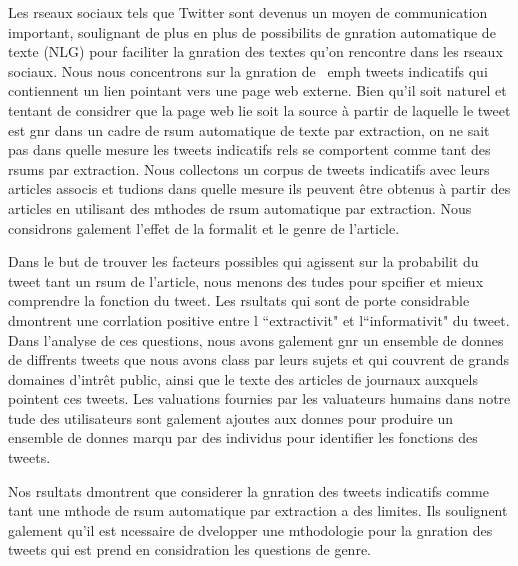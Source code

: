 Les rseaux  sociaux tels que Twitter sont devenus un moyen de communication important, soulignant de plus en plus de possibilits de gnration automatique de texte (NLG) pour faciliter la gnration des textes qu’on rencontre dans les rseaux  sociaux. Nous nous concentrons sur la gnration de \ emph {tweets indicatifs} qui contiennent un lien pointant vers une page web externe. Bien qu’il soit naturel et tentant de considrer que la page web lie soit la source à partir de laquelle le tweet est gnr dans un cadre de rsum automatique de texte par extraction, on ne sait pas dans quelle mesure les tweets indicatifs rels se comportent comme tant des rsums par extraction. Nous collectons un corpus de tweets indicatifs avec leurs articles associs et tudions dans quelle mesure ils peuvent être obtenus à partir des articles en utilisant des mthodes de rsum automatique par extraction. Nous considrons galement l'effet de la formalit et le genre de l'article.

Dans le but de trouver les facteurs possibles qui agissent sur la probabilit du tweet tant un rsum de l'article, nous menons des tudes pour spcifier et mieux comprendre la fonction du tweet. Les rsultats qui sont de porte considrable dmontrent une corrlation positive entre l ``extractivit" et l``informativit" du tweet. Dans l'analyse de ces questions, nous avons galement gnr un ensemble de donnes de diffrents tweets que nous avons class par leurs sujets et qui couvrent de grands domaines d'intrêt public, ainsi que le texte des articles de journaux auxquels pointent ces tweets. Les valuations fournies par les valuateurs humains dans notre tude des utilisateurs sont galement ajoutes aux donnes pour produire un ensemble de donnes marqu par des individus pour identifier les fonctions des tweets.

Nos rsultats dmontrent que considerer la gnration des tweets indicatifs comme tant une mthode de rsum automatique par extraction a des limites. Ils soulignent galement qu’il est ncessaire de dvelopper une mthodologie pour la gnration des tweets qui est prend en considration les questions de genre.